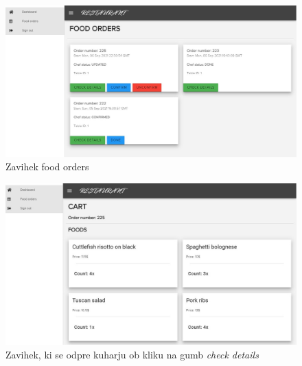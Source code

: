 \documentclass[a4paper, 12pt]{book}
\begin{document}
\begin{figure}[!htb]
\begin{center}
\includegraphics[width=13cm]{kuhar_4.jpg}
\caption{Zavihek food orders}
\label{Kuhar_4}
\end{center}
\end{figure}

\begin{figure}[!htb]
\begin{center}
\includegraphics[width=13cm]{kuhar_3.jpg}
\caption{Zavihek, ki se odpre kuharju ob kliku na gumb \textit{check details}}
\label{Kuhar_3}
\end{center}
\end{figure}
\end{document}
